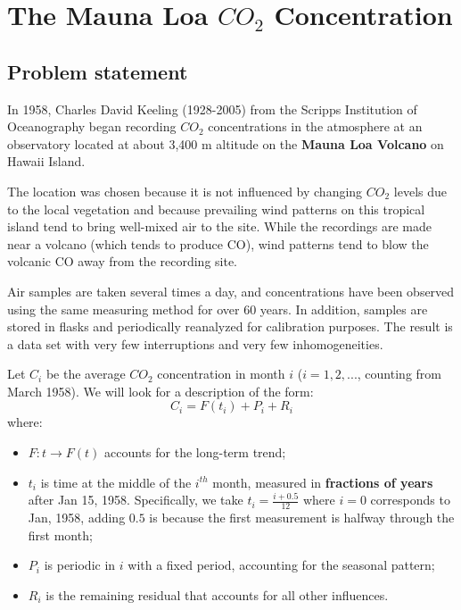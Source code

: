 \documentclass[12pt,a4paper]{article}
\begin{document}
\section{The Mauna Loa $CO_2$ Concentration}

\subsection{Problem statement}

In 1958, Charles David Keeling (1928-2005) from the Scripps Institution of Oceanography began recording $CO_2$ concentrations in the atmosphere at an observatory located at about 3,400 m altitude on the \textbf{Mauna Loa Volcano} on Hawaii Island. 

The location was chosen because it is not influenced by changing $CO_2$ levels due to the local vegetation and because prevailing wind patterns on this tropical island tend to bring well-mixed air to the site. While the recordings are made near a volcano (which tends to produce CO), wind patterns tend to blow the volcanic CO away from the recording site. 

Air samples are taken several times a day, and concentrations have been observed using the same measuring method for over 60 years. In addition, samples are stored in flasks and periodically reanalyzed for calibration purposes. The result is a data set with very few interruptions and very few inhomogeneities.

Let $C_i$ be the average $CO_2$ concentration in month $i$ ($i=1,2, ...$, counting from March 1958). We will look for a description of the form:
\begin{equation}
	C_i = F(t_i) + P_i + R_i
\end{equation}
where:
\begin{itemize}
	\item $F: t \to F(t)$ accounts for the long-term trend;
	\item $t_i$ is time at the middle of the $i^{th}$ month, measured in \textbf{fractions of years} after Jan 15, 1958. Specifically, we take $t_i = \frac{i+0.5}{12}$ where $i=0$ corresponds to Jan, 1958, adding $0.5$ is because the first measurement is halfway through the first month;
	\item $P_i$ is periodic in $i$ with a fixed period, accounting for the seasonal pattern;
	\item $R_i$ is the remaining residual that accounts for all other influences.
\end{itemize}
\end{document}
